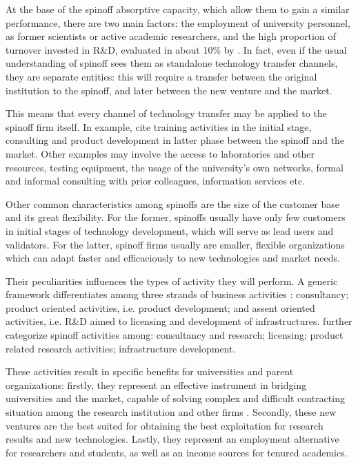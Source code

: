 At the base of the spinoff absorptive capacity, which allow them to gain a similar performance, there are two main factors: the employment of university personnel, as former scientists or active academic researchers, and the high proportion of turnover invested in R\&D, evaluated in about 10\% by \citet{Perez2003}. In fact, even if the usual understanding of spinoff sees them as standalone technology transfer channels, they are separate entities: this will require a transfer between the original institution to the spinoff, and later between the new venture and the market. 

This means that every channel of technology transfer may be applied to the spinoff firm itself. In example, \citet{Perez2003} cite training activities in the initial stage, consulting and product development in latter phase between the spinoff and the market. Other examples may involve the access to laboratories and other resources, testing equipment, the usage of the university's own networks, formal and informal consulting with prior colleagues, information services etc.

Other common characteristics among spinoffs are the size of the customer base and its great flexibility. For the former, spinoffs usually have only few customers in initial stages of technology development, which will serve as lead users and validators. For the latter, spinoff firms usually are smaller, flexible organizations which can adapt faster and efficaciously to new technologies and market needs. 

Their peculiarities influences the types of activity they will perform. A generic framework differentiates among three strands of business activities \citep{Mustar2006}: consultancy; product oriented activities, i.e. product development; and assent oriented activities, i.e. R\&D aimed to licensing and development of infrastructures. \citet{Druilhe2004} further categorize spinoff activities among: consultancy and research; licensing; product related research activities; infrastructure development. 

These activities result in specific benefits for universities and parent organizations: firstly, they represent an effective instrument in bridging universities and the market, capable of solving complex and difficult contracting situation among the research institution and other firms \citep{Rizzo2015}. Secondly, these new ventures are the best suited for obtaining the best exploitation for research results and new technologies. Lastly, they represent an employment alternative for researchers and students, as well as an income sources for tenured academics.

